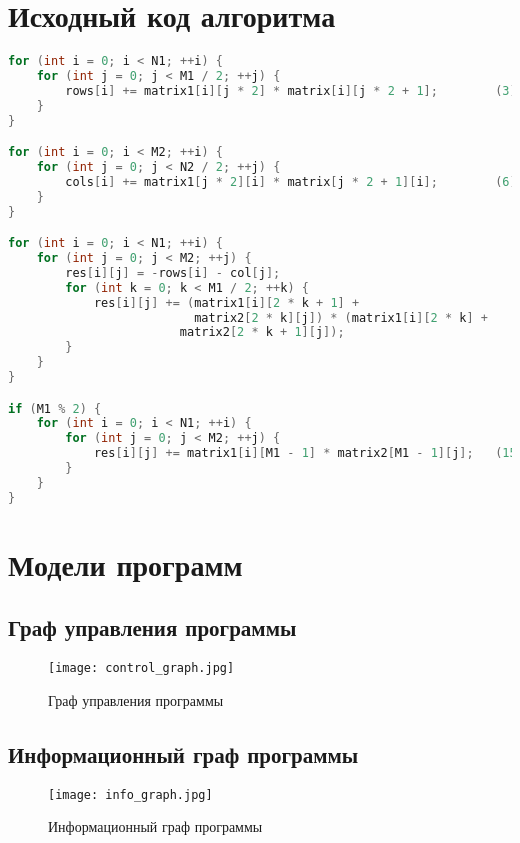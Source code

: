 \documentclass[12pt]{report}
\begin{document}
\tableofcontents

\newpage
\chapter{Исходный код алгоритма}

\begin{lstlisting}[label=some-code,caption=Функция умножения матриц по Винограду, language=C]
for (int i = 0; i < N1; ++i) {															(1)
	for (int j = 0; j < M1 / 2; ++j) {												(2)
		rows[i] += matrix1[i][j * 2] * matrix[i][j * 2 + 1]; 		(3)
	}
}

for (int i = 0; i < M2; ++i) {															(4)
	for (int j = 0; j < N2 / 2; ++j) {												(5)
		cols[i] += matrix1[j * 2][i] * matrix[j * 2 + 1][i];		(6)
	}
}

for (int i = 0; i < N1; ++i) {															(7)
	for (int j = 0; j < M2; ++j) {														(8)
		res[i][j] = -rows[i] - col[j];											  	(9)
		for (int k = 0; k < M1 / 2; ++k) {											(10)
			res[i][j] += (matrix1[i][2 * k + 1] +
			 			  matrix2[2 * k][j]) * (matrix1[i][2 * k] +
			  			matrix2[2 * k + 1][j]);												(11)
		}
	}
}

if (M1 % 2) {																								(12)
	for (int i = 0; i < N1; ++i) {														(13)
		for (int j = 0; j < M2; ++j) {													(14)
			res[i][j] += matrix1[i][M1 - 1] * matrix2[M1 - 1][j];	(15)
		}
	}
}
\end{lstlisting}

\chapter{Модели программ}

\section{Граф управления программы}

\begin{figure}[h]
	\centering
	\texttt{[image: control\_graph.jpg]}
	\caption{Граф управления программы}
	\label{fig:mpr}
\end{figure}

\section{Информационный граф программы}

\begin{figure}[h]
	\centering
	\texttt{[image: info\_graph.jpg]}
	\caption{Информационный граф программы}
	\label{fig:mpr}
\end{figure}
\end{document}
